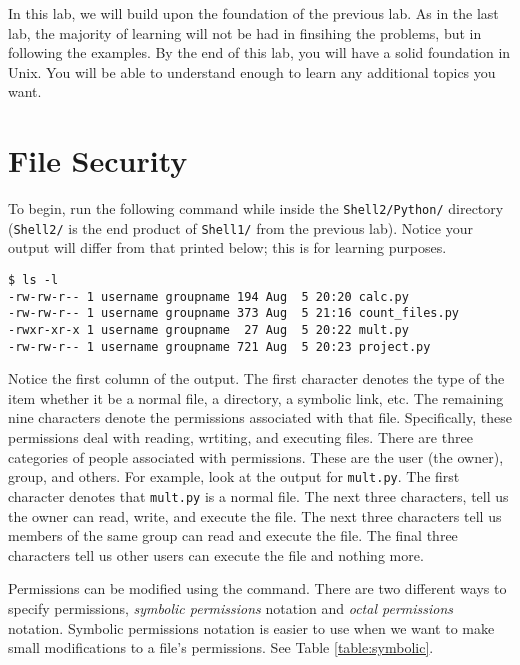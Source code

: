\label{lab:Shell}


In this lab, we will build upon the foundation of the previous lab.
As in the last lab, the majority of learning will not be had in finsihing the problems, but in following the examples.
By the end of this lab, you will have a solid foundation in Unix.
You will be able to understand enough to learn any additional topics you want.

\section*{File Security} %

To begin, run the following command while inside the \texttt{Shell2/Python/} directory (\texttt{Shell2/} is the end product of \texttt{Shell1/} from the previous lab).
Notice your output will differ from that printed below; this is for learning purposes.

\begin{lstlisting}
$ ls -l
-rw-rw-r-- 1 username groupname 194 Aug  5 20:20 calc.py
-rw-rw-r-- 1 username groupname 373 Aug  5 21:16 count_files.py
-rwxr-xr-x 1 username groupname  27 Aug  5 20:22 mult.py
-rw-rw-r-- 1 username groupname 721 Aug  5 20:23 project.py
\end{lstlisting}

Notice the first column of the output.
The first character denotes the type of the item whether it be a normal file, a directory, a symbolic link, etc.
The remaining nine characters denote the permissions associated with that file.
Specifically, these permissions deal with reading, wrtiting, and executing files.
There are three categories of people associated with permissions.
These are the user (the owner), group, and others.
For example, look at the output for \texttt{mult.py}.
The first character \li{-} denotes that \texttt{mult.py} is a normal file.
The next three characters,  tell us the owner can read, write, and execute the file.
The next three characters  tell us members of the same group can read and execute the file.
The final three characters  tell us other users can execute the file and nothing more.

Permissions can be modified using the  command.
There are two different ways to specify permissions, \emph{symbolic permissions} notation and \emph{octal permissions} notation.
Symbolic permissions notation is easier to use when we want to make small modifications to a file's permissions.
See Table \ref{table:symbolic}.

